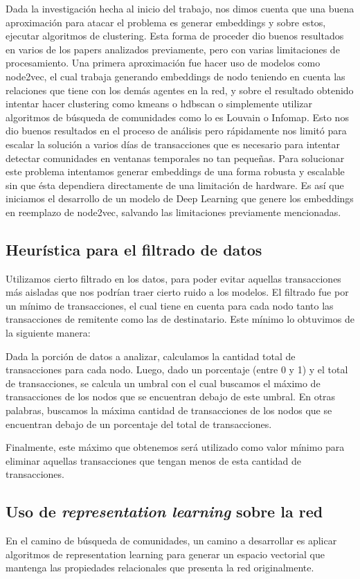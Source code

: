 \documentclass{article}
\begin{document}
Dada la investigación hecha al inicio del trabajo, nos dimos cuenta que una buena aproximación para atacar el problema es generar embeddings y sobre estos, ejecutar algoritmos de clustering.
Esta forma de proceder dio buenos resultados en varios de los papers analizados previamente, pero con varias limitaciones de procesamiento. Una primera aproximación fue hacer uso de modelos como node2vec, el cual trabaja generando embeddings de nodo teniendo en cuenta las relaciones que tiene con los demás agentes en la red, y sobre el resultado obtenido intentar hacer clustering como kmeans o hdbscan o simplemente utilizar algoritmos de búsqueda de comunidades como lo es Louvain o Infomap. Esto nos dio buenos resultados en el proceso de análisis pero rápidamente nos limitó para escalar la solución a varios días de transacciones que es necesario para intentar detectar comunidades en ventanas temporales no tan pequeñas. Para solucionar este problema intentamos generar embeddings de una forma robusta y escalable sin que ésta dependiera directamente de una limitación de hardware. Es así que iniciamos el desarrollo de un modelo de Deep Learning que genere los embeddings en reemplazo de node2vec, salvando las limitaciones previamente mencionadas.

\subsection{Heurística para el filtrado de datos}
Utilizamos cierto filtrado en los datos, para poder evitar aquellas transacciones más aisladas que nos podrían traer cierto ruido a los modelos. El filtrado fue por un mínimo de transacciones, el cual tiene en cuenta para cada nodo tanto las transacciones de remitente como las de destinatario. Este mínimo lo obtuvimos de la siguiente manera:

Dada la porción de datos a analizar, calculamos la cantidad total de transacciones para cada nodo. Luego, dado un porcentaje (entre 0 y 1) y el total de transacciones, se calcula un umbral con el cual buscamos el máximo de transacciones de los nodos que se encuentran debajo de este umbral. En otras palabras, buscamos la máxima cantidad de transacciones de los nodos que se encuentran debajo de un porcentaje del total de transacciones.

Finalmente, este máximo que obtenemos será utilizado como valor mínimo para eliminar aquellas transacciones que tengan menos de esta cantidad de transacciones.

\subsection{Uso de \textit{representation learning} sobre la red}
En el camino de búsqueda de comunidades, un camino a desarrollar es aplicar algoritmos de representation learning para generar un espacio vectorial que mantenga las propiedades relacionales que presenta la red originalmente.
\end{document}
